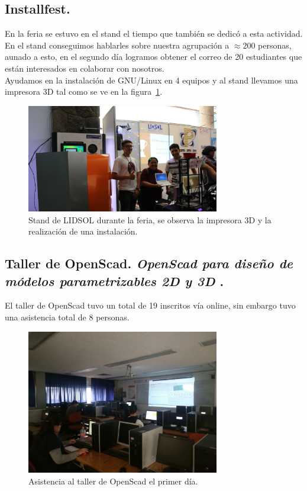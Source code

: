\documentclass[a4paper,11pt]{article}                 %
\begin{document}
  \subsection{Installfest.}  
  En la feria se estuvo en el stand el tiempo que también se dedicó a esta actividad.\\ En el stand conseguimos hablarles sobre nuestra agrupación a $\approx 200$ personas, aunado a esto, en el segundo día logramos obtener el correo de 20 estudiantes que están interesados en colaborar con nosotros.\\ Ayudamos en la instalación de GNU/Linux en 4 equipos y al stand llevamos una impresora 3D tal como se ve en la figura~\ref{fig:installfest-01}.
    \begin{figure}[H]
    \begin{center}
      \includegraphics[width=0.75\textwidth]{images/installfest-01}
      \caption{Stand de LIDSOL durante la feria, se observa la impresora 3D y la realización de una instalación.}
      \label{fig:installfest-01}
    \end{center}
  \end{figure}
  
  \subsection{Taller de OpenScad. \textit{OpenScad para diseño de módelos parametrizables 2D y 3D} .}
  
  El taller de OpenScad tuvo un total de 19 inscritos vía online, sin embargo tuvo una asistencia total de 8 personas.
       \begin{figure}[H]
    \begin{center}
      \includegraphics[width=0.75\textwidth]{images/openscad-01}
      \caption{Asistencia al taller de OpenScad el primer día.}
      \label{fig:openscad-01}
    \end{center}
  \end{figure}
  
\end{document}

